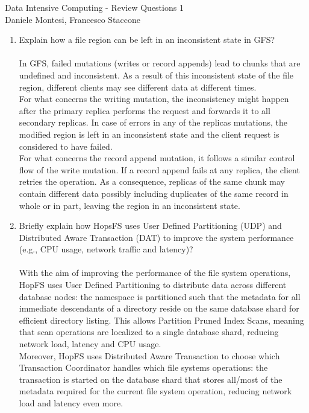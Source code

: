 \documentclass[]{report}
\begin{document}
\begin{center}
 {\Large Data Intensive Computing - Review Questions 1}\\
 \vspace{0.5cm}
 {\small Daniele Montesi, Francesco Staccone}
\end{center}
\vspace{0.5cm}
\justify
\begin{enumerate}
 \item Explain how a file region can be left in an inconsistent state in GFS?\\\\
In GFS, failed mutations (writes or record appends) lead to chunks that are undefined and inconsistent. As a result of this inconsistent state of the file region, different clients may see different data at different times. \\
For what concerns the writing mutation, the inconsistency might happen after the primary replica performs the request and forwards it to all secondary replicas. In case of errors in any of the replicas mutations, the modified region is left in an inconsistent state and the client request is considered to have failed. \\
For what concerns the record append mutation, it follows a similar control flow of the write mutation. If a record append fails at any replica, the client retries the operation. As a consequence, replicas of the same chunk may contain different data possibly including duplicates of the same record in whole or in part, leaving the region in an inconsistent state.
 
 \item Briefly explain how HopsFS uses User Defined Partitioning (UDP) and Distributed Aware Transaction (DAT) to improve the system performance (e.g., CPU usage, network traffic and latency)?\\\\
With the aim of improving the performance of the file system operations, HopFS uses User Defined Partitioning to distribute data across different database nodes: the namespace is partitioned such that the metadata for all immediate descendants of a directory reside on the same database shard for efficient directory listing. This allows Partition Pruned Index Scans, meaning that scan operations are localized to a single database shard, reducing network load, latency and CPU usage.\\
Moreover, HopFS uses Distributed Aware Transaction to choose which Transaction Coordinator handles which file systems operations: the transaction is started on the database shard that stores all/most of the metadata required for the current file system operation, reducing network load and latency even more.


\end{enumerate}
\end{document}
